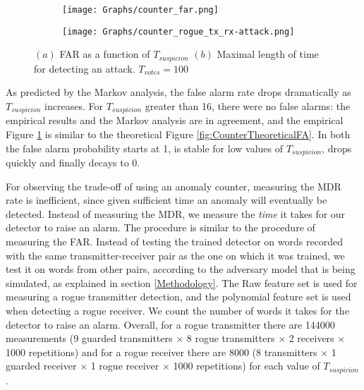 \documentclass[english]{llncs}
\begin{document}
  \begin{figure}[t]
    \centering
    \begin{subfigure}{0.5\linewidth}
      \centering
      \texttt{[image: Graphs/counter\_far.png]}
      \caption{}
      \label{fig:counter_far}
    \end{subfigure}%
    \begin{subfigure}{0.5\linewidth}
      \centering
      \texttt{[image: Graphs/counter\_rogue\_tx\_rx-attack.png]}
      \caption{}
      \label{fig:counter_detection_time_rogue_tx}
      \label{fig:counter_detection_time_rogue_rx}
    \end{subfigure}
    \caption{\((a)\) FAR as a function of $T_{suspicion}$ \((b)\) Maximal length of time for detecting an attack. $T_{votes} = 100$}
  \end{figure}
  
  As predicted by the Markov analysis, the false alarm rate drops dramatically as $T_{suspicion}$ increases. For $T_{suspicion}$ greater than 16, there were no false alarms: the empirical results and the Markov analysis are in agreement, and the empirical Figure \ref{fig:counter_far} is similar to the theoretical Figure \ref{fig:CounterTheoreticalFA}. In both the false alarm probability starts at 1, is stable for low values of $T_{suspicion}$, drops quickly and finally decays to 0.
  
  For observing the trade-off of using an anomaly counter, measuring the MDR rate is inefficient, since given sufficient time an anomaly will eventually be detected. Instead of measuring the MDR, we measure the \emph{time} it takes for our detector to raise an alarm. The procedure is similar to the procedure of measuring the FAR. Instead of testing the trained detector on words recorded with the same transmitter-receiver pair as the one on which it was trained, we test it on words from other pairs, according to the adversary model that is being simulated, as explained in section \ref{Methodology}. The Raw feature set is used for measuring a rogue transmitter detection, and the polynomial feature set is used when detecting a rogue receiver. We count the number of words it takes for the detector to raise an alarm. Overall, for a rogue transmitter there are 144000 measurements (9 guarded transmitters $\times$ 8 rogue transmitters $\times$ 2 receivers $\times$ 1000 repetitions) and for a rogue receiver there are 8000
  (8 transmitters $\times$ 1 guarded receiver $\times$ 1 rogue receiver $\times$ 1000 repetitions) for each value of $T_{suspicion}$.
  
\end{document}
